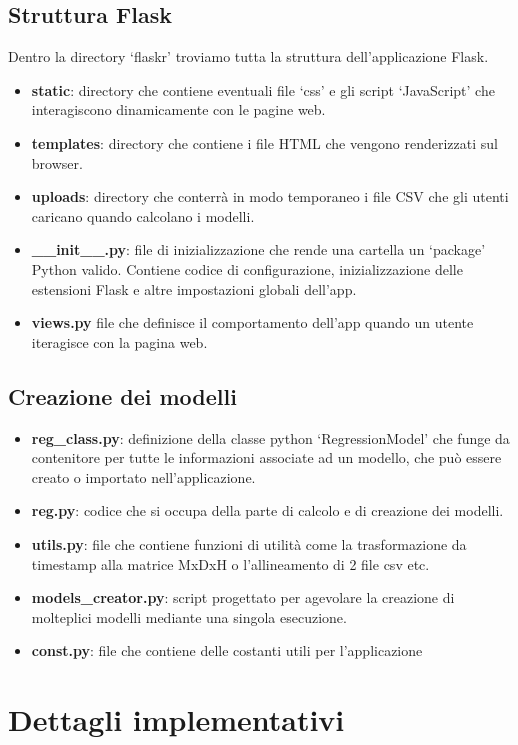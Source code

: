 \documentclass[a4paper,10pt]{article}
\begin{document}
\subsection{Struttura Flask}
Dentro la directory `flaskr' troviamo tutta la struttura dell'applicazione Flask.
\begin{itemize}
  \item \textbf{static}: directory che contiene eventuali file `css' e gli script `JavaScript' che interagiscono dinamicamente con le pagine web.
  \item \textbf{templates}: directory che contiene i file HTML che vengono renderizzati sul browser.
  \item \textbf{uploads}: directory che conterrà in modo temporaneo i file CSV che gli utenti caricano quando calcolano i modelli.
  \item \textbf{\_\_init\_\_.py}: file di inizializzazione che rende una cartella un `package' Python valido. Contiene codice di configurazione, 
  inizializzazione delle estensioni Flask e altre impostazioni globali dell'app.
  \item \textbf{views.py} file che definisce il comportamento dell'app quando un utente iteragisce con la pagina web.
\end{itemize}

\subsection{Creazione dei modelli}
\begin{itemize}
  \item \textbf{reg\_class.py}: definizione della classe python `RegressionModel' che funge da contenitore per tutte le
  informazioni associate ad un modello, che può essere creato o importato nell'applicazione.
  \item \textbf{reg.py}: codice che si occupa della parte di calcolo e di creazione dei modelli.
  \item \textbf{utils.py}: file che contiene funzioni di utilità come la trasformazione da timestamp alla matrice MxDxH o l'allineamento di 2 file csv etc.
  \item \textbf{models\_creator.py}: script progettato per agevolare la creazione di molteplici modelli mediante una singola esecuzione.
  \item \textbf{const.py}: file che contiene delle costanti utili per l'applicazione
\end{itemize}


\section{Dettagli implementativi}
\end{document}
